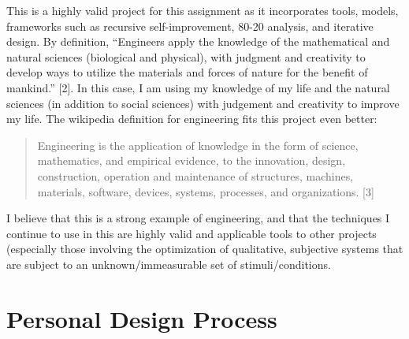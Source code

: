 \documentclass[a4paper,12pt]{article}
\begin{document}
This is a highly valid project for this assignment as it incorporates tools, models, frameworks such as recursive self-improvement, 80-20 analysis, and iterative design. By definition, “Engineers apply the knowledge of the mathematical and natural sciences (biological and physical), with judgment and creativity to develop ways to utilize the materials and forces of nature for the benefit of mankind.” [2]. In this case, I am using my knowledge of my life and the natural sciences (in addition to social sciences) with judgement and creativity to improve my life. The wikipedia definition for engineering fits this project even better:
\begin{quote}
Engineering is the application of knowledge in the form of science, mathematics, and empirical evidence, to the innovation, design, construction, operation and maintenance of structures, machines, materials, software, devices, systems, processes, and organizations. [3]
\end{quote}
I believe that this is a strong example of engineering, and that the techniques I continue to use in this are highly valid and applicable tools to other projects (especially those involving the optimization of qualitative, subjective systems that are subject to an unknown/immeasurable set of stimuli/conditions.


\section{Personal Design Process}
\end{document}
